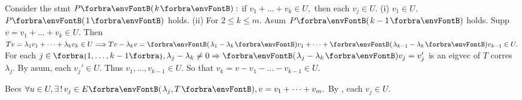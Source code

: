Consider the stmt $P\Par{k}:$ if $v_1+\dots+v_k\in U,$ then each $v_j\in U.$\parSol{}
(i) $v_1\in U.$ $P\Par{1}$ holds. (ii) For $2\leqslant k\leqslant m.$ Asum $P\Par{k-1}$ holds. Supp $v=v_1+\dots+v_k\in U.$\parSol{}
Then $Tv=\lambda_1v_1+\dots+\lambda_k v_k\in U\Longrightarrow Tv-\lambda_k v=\Par{\lambda_1-\lambda_k}v_1+\dots+\Par{\lambda_{k-1}-\lambda_k}v_{k-1}\in U.$\parSol{}
For each $j\in\;\!\!\Bra{1,\dots,k-1},\lambda_j-\lambda_{k}\neq 0\Rightarrow\Par{\lambda_j-\lambda_k}v_j=v_j'$ is an eigvec of $T$ corres $\lambda_j.$\parSol{}
By asum, each $v_j'\in U.$ Thus $v_1,\dots,v_{k-1}\in U.$ So that $v_k=v-v_1-\dots-v_{k-1}\in U.$\PfEnd
\SepLine[0pt][\Blind{\BulletPointX} ]

Becs $\forall u\in U,\exists\,!\,v_j\in E\Par{\lambda_j,T},v=v_1+\dots+v_m.$ By , each $v_j\in U.$\PfEnd%
\SepLine

%

